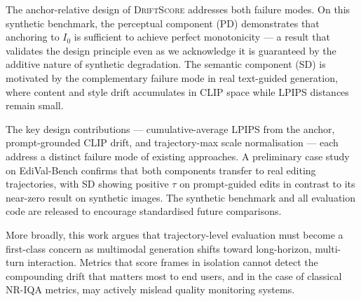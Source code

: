 \documentclass[sigconf]{acmart}
\newcommand{\DS}{\textsc{DriftScore}}
\newcommand{\Izero}{\ensuremath{I_0}}
\begin{document}
The anchor-relative design of \DS{} addresses both failure modes.
On this synthetic benchmark, the perceptual component (PD) demonstrates
that anchoring to $\Izero$ is sufficient to achieve perfect monotonicity
--- a result that validates the design principle even as we acknowledge
it is guaranteed by the additive nature of synthetic degradation.
The semantic component (SD) is motivated by the complementary failure
mode in real text-guided generation, where content and style drift
accumulates in CLIP space while LPIPS distances remain small.

The key design contributions --- cumulative-average LPIPS from the anchor,
prompt-grounded CLIP drift, and trajectory-max scale normalisation ---
each address a distinct failure mode of existing approaches.
A preliminary case study on EdiVal-Bench confirms that both components
transfer to real editing trajectories, with SD showing positive $\tau$ on
prompt-guided edits in contrast to its near-zero result on synthetic images.
The synthetic benchmark and all evaluation code are released to encourage
standardised future comparisons.

More broadly, this work argues that trajectory-level evaluation must
become a first-class concern as multimodal generation shifts toward
long-horizon, multi-turn interaction.
Metrics that score frames in isolation cannot detect the compounding
drift that matters most to end users, and in the case of classical NR-IQA
metrics, may actively mislead quality monitoring systems.
\end{document}
